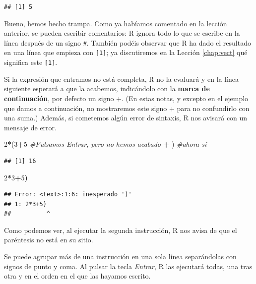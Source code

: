 \documentclass[]{book}
\newenvironment{Shaded}{\begin{snugshade}}{\end{snugshade}}
\newcommand{\CommentTok}[1]{\textcolor[rgb]{0.56,0.35,0.01}{\textit{#1}}}
\newcommand{\DecValTok}[1]{\textcolor[rgb]{0.00,0.00,0.81}{#1}}
\newcommand{\ErrorTok}[1]{\textcolor[rgb]{0.64,0.00,0.00}{\textbf{#1}}}
\newcommand{\NormalTok}[1]{#1}
\newcommand{\OperatorTok}[1]{\textcolor[rgb]{0.81,0.36,0.00}{\textbf{#1}}}
\newcommand{\StringTok}[1]{\textcolor[rgb]{0.31,0.60,0.02}{#1}}
\theoremstyle{definition}
\theoremstyle{definition}
\theoremstyle{definition}
\theoremstyle{remark}
\begin{document}
\begin{verbatim}
## [1] 5
\end{verbatim}

Bueno, hemos hecho trampa. Como ya habíamos comentado en la lección anterior, se pueden escribir comentarios: R ignora todo lo que se escribe en la línea después de un signo \texttt{\#}. También podéis observar que R ha dado el resultado en una línea que empieza con \texttt{{[}1{]}}; ya discutiremos en la Lección \ref{chap:vect} qué significa este \texttt{{[}1{]}}.

Si la expresión que entramos no está completa, R no la evaluará y en la línea siguiente esperará a que la acabemos, indicándolo con la \textbf{marca de continuación}, por defecto un signo +. (En estas notas, y excepto en el ejemplo que damos a continuación, no mostraremos este signo + para no confundirlo con una suma.) Además, si cometemos algún error de sintaxis, R nos avisará con un mensaje de error.

\begin{Shaded}
\begin{Highlighting}[]
\DecValTok{2}\OperatorTok{*}\NormalTok{(}\DecValTok{3}\OperatorTok{+}\DecValTok{5} \CommentTok{#Pulsamos Entrar, pero no hemos acabado}
\OperatorTok{+}\StringTok{ }\NormalTok{) }\CommentTok{#ahora sí}
\end{Highlighting}
\end{Shaded}

\begin{verbatim}
## [1] 16
\end{verbatim}

\begin{Shaded}
\begin{Highlighting}[]
\DecValTok{2}\OperatorTok{*}\DecValTok{3}\OperatorTok{+}\DecValTok{5}\ErrorTok{)}
\end{Highlighting}
\end{Shaded}

\begin{verbatim}
## Error: <text>:1:6: inesperado ')'
## 1: 2*3+5)
##          ^
\end{verbatim}

Como podemos ver, al ejecutar la segunda instrucción, R nos avisa de que el paréntesis no está en su sitio.

Se puede agrupar más de una instrucción en una sola línea separándolas con signos de punto y coma. Al pulsar la tecla \emph{Entrar}, R las ejecutará todas, una tras otra y en el orden en el que las hayamos escrito.
\end{document}
